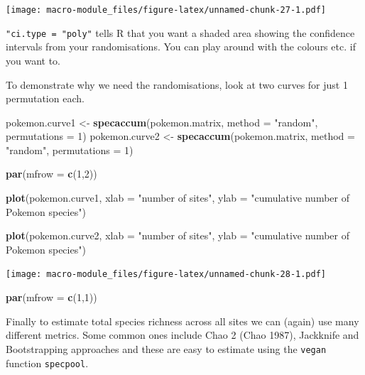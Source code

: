 \documentclass[]{book}
\newenvironment{Shaded}{\begin{snugshade}}{\end{snugshade}}
\newcommand{\KeywordTok}[1]{\textcolor[rgb]{0.13,0.29,0.53}{\textbf{{#1}}}}
\newcommand{\DataTypeTok}[1]{\textcolor[rgb]{0.13,0.29,0.53}{{#1}}}
\newcommand{\DecValTok}[1]{\textcolor[rgb]{0.00,0.00,0.81}{{#1}}}
\newcommand{\StringTok}[1]{\textcolor[rgb]{0.31,0.60,0.02}{{#1}}}
\newcommand{\NormalTok}[1]{{#1}}
\begin{document}
\texttt{[image: macro-module\_files/figure-latex/unnamed-chunk-27-1.pdf]}

\texttt{"ci.type\ =\ "poly"} tells R that you want a shaded area showing
the confidence intervals from your randomisations. You can play around
with the colours etc. if you want to.

To demonstrate why we need the randomisations, look at two curves for
just 1 permutation each.

\begin{Shaded}
\begin{Highlighting}[]
\NormalTok{pokemon.curve1 <-}\StringTok{ }\KeywordTok{specaccum}\NormalTok{(pokemon.matrix, }\DataTypeTok{method =} \StringTok{"random"}\NormalTok{, }\DataTypeTok{permutations =} \DecValTok{1}\NormalTok{)}
\NormalTok{pokemon.curve2 <-}\StringTok{ }\KeywordTok{specaccum}\NormalTok{(pokemon.matrix, }\DataTypeTok{method =} \StringTok{"random"}\NormalTok{, }\DataTypeTok{permutations =} \DecValTok{1}\NormalTok{)}

\KeywordTok{par}\NormalTok{(}\DataTypeTok{mfrow =} \KeywordTok{c}\NormalTok{(}\DecValTok{1}\NormalTok{,}\DecValTok{2}\NormalTok{))}

\KeywordTok{plot}\NormalTok{(pokemon.curve1,  }
    \DataTypeTok{xlab =} \StringTok{"number of sites"}\NormalTok{, }\DataTypeTok{ylab =} \StringTok{"cumulative number of Pokemon species"}\NormalTok{)}

\KeywordTok{plot}\NormalTok{(pokemon.curve2, }
    \DataTypeTok{xlab =} \StringTok{"number of sites"}\NormalTok{, }\DataTypeTok{ylab =} \StringTok{"cumulative number of Pokemon species"}\NormalTok{)}
\end{Highlighting}
\end{Shaded}

\texttt{[image: macro-module\_files/figure-latex/unnamed-chunk-28-1.pdf]}

\begin{Shaded}
\begin{Highlighting}[]
\KeywordTok{par}\NormalTok{(}\DataTypeTok{mfrow =} \KeywordTok{c}\NormalTok{(}\DecValTok{1}\NormalTok{,}\DecValTok{1}\NormalTok{))}
\end{Highlighting}
\end{Shaded}

Finally to estimate total species richness across all sites we can
(again) use many different metrics. Some common ones include Chao 2
(Chao 1987), Jackknife and Bootstrapping approaches and these are easy
to estimate using the \texttt{vegan} function \texttt{specpool}.
\end{document}
